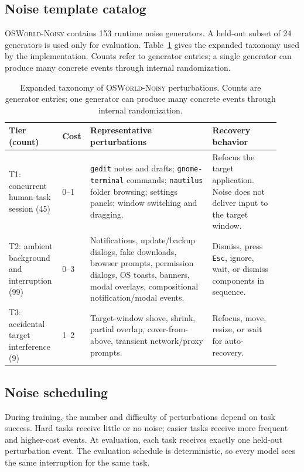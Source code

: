 \documentclass[11pt]{article}
\begin{document}
\subsection{Noise template catalog}
\label{app:noise}

\textsc{OSWorld-Noisy} contains 153 runtime noise generators. A held-out subset of 24 generators is used only for evaluation. Table~\ref{tab:noise-taxonomy-full} gives the expanded taxonomy used by the implementation. Counts refer to generator entries; a single generator can produce many concrete events through internal randomization.

\begin{table}[h]
\centering
\caption{Expanded taxonomy of \textsc{OSWorld-Noisy} perturbations. Counts are generator entries; one generator can produce many concrete events through internal randomization.}
\label{tab:noise-taxonomy-full}
\scriptsize
\begin{tabular}{p{0.18\linewidth} p{0.07\linewidth} p{0.43\linewidth} p{0.24\linewidth}}
\toprule
Tier (count) & Cost & Representative perturbations & Recovery behavior \\
\midrule
T1: concurrent human-task session (45)
& 0--1
& \texttt{gedit} notes and drafts; \texttt{gnome-terminal} commands; \texttt{nautilus} folder browsing; settings panels; window switching and dragging.
& Refocus the target application. Noise does not deliver input to the target window. \\
\midrule
T2: ambient background and interruption (99)
& 0--3
& Notifications, update/backup dialogs, fake downloads, browser prompts, permission dialogs, OS toasts, banners, modal overlays, compositional notification/modal events.
& Dismiss, press \texttt{Esc}, ignore, wait, or dismiss components in sequence. \\
\midrule
T3: accidental target interference (9)
& 1--2
& Target-window shove, shrink, partial overlap, cover-from-above, transient network/proxy prompts.
& Refocus, move, resize, or wait for auto-recovery. \\
\bottomrule
\end{tabular}
\end{table}

\subsection{Noise scheduling}
\label{app:noise-scheduling}

During training, the number and difficulty of perturbations depend on task success. Hard tasks receive little or no noise; easier tasks receive more frequent and higher-cost events. At evaluation, each task receives exactly one held-out perturbation event. The evaluation schedule is deterministic, so every model sees the same interruption for the same task.
\end{document}
